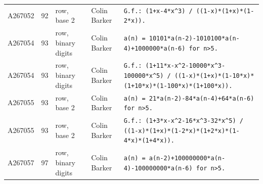 \documentclass[11pt]{article}
\theoremstyle{definition}
\theoremstyle{remark}
\begin{document}
{\begin{longtable}{p{1.3cm}p{0.7cm}p{2.4cm}p{2.3cm}p{7.3cm}}
A267052 & 92 & row, base 2 & Colin Barker & \texttt{G.f.: \allowbreak{}(1+\allowbreak{}x-\allowbreak{}4*\allowbreak{}x\^{}3)\allowbreak{} \allowbreak{}/\allowbreak{} \allowbreak{}((1-\allowbreak{}x)\allowbreak{}*\allowbreak{}(1+\allowbreak{}x)\allowbreak{}*\allowbreak{}(1-\allowbreak{}2*\allowbreak{}x)\allowbreak{})\allowbreak{}.} \\
A267054 & 93 & row, binary digits & Colin Barker & \texttt{a(n)\allowbreak{} \allowbreak{}=\allowbreak{} \allowbreak{}10101*\allowbreak{}a(n-\allowbreak{}2)\allowbreak{}-\allowbreak{}1010100*\allowbreak{}a(n-\allowbreak{}4)\allowbreak{}+\allowbreak{}1000000*\allowbreak{}a(n-\allowbreak{}6)\allowbreak{} \allowbreak{}for \allowbreak{}n>5.} \\
A267054 & 93 & row, binary digits & Colin Barker & \texttt{G.f.: \allowbreak{}(1+\allowbreak{}11*\allowbreak{}x-\allowbreak{}x\^{}2-\allowbreak{}10000*\allowbreak{}x\^{}3-\allowbreak{}100000*\allowbreak{}x\^{}5)\allowbreak{} \allowbreak{}/\allowbreak{} \allowbreak{}((1-\allowbreak{}x)\allowbreak{}*\allowbreak{}(1+\allowbreak{}x)\allowbreak{}*\allowbreak{}(1-\allowbreak{}10*\allowbreak{}x)\allowbreak{}*\allowbreak{}(1+\allowbreak{}10*\allowbreak{}x)\allowbreak{}*\allowbreak{}(1-\allowbreak{}100*\allowbreak{}x)\allowbreak{}*\allowbreak{}(1+\allowbreak{}100*\allowbreak{}x)\allowbreak{})\allowbreak{}.} \\
A267055 & 93 & row, base 2 & Colin Barker & \texttt{a(n)\allowbreak{} \allowbreak{}=\allowbreak{} \allowbreak{}21*\allowbreak{}a(n-\allowbreak{}2)\allowbreak{}-\allowbreak{}84*\allowbreak{}a(n-\allowbreak{}4)\allowbreak{}+\allowbreak{}64*\allowbreak{}a(n-\allowbreak{}6)\allowbreak{} \allowbreak{}for \allowbreak{}n>5.} \\
A267055 & 93 & row, base 2 & Colin Barker & \texttt{G.f.: \allowbreak{}(1+\allowbreak{}3*\allowbreak{}x-\allowbreak{}x\^{}2-\allowbreak{}16*\allowbreak{}x\^{}3-\allowbreak{}32*\allowbreak{}x\^{}5)\allowbreak{} \allowbreak{}/\allowbreak{} \allowbreak{}((1-\allowbreak{}x)\allowbreak{}*\allowbreak{}(1+\allowbreak{}x)\allowbreak{}*\allowbreak{}(1-\allowbreak{}2*\allowbreak{}x)\allowbreak{}*\allowbreak{}(1+\allowbreak{}2*\allowbreak{}x)\allowbreak{}*\allowbreak{}(1-\allowbreak{}4*\allowbreak{}x)\allowbreak{}*\allowbreak{}(1+\allowbreak{}4*\allowbreak{}x)\allowbreak{})\allowbreak{}.} \\
A267057 & 97 & row, binary digits & Colin Barker & \texttt{a(n)\allowbreak{} \allowbreak{}=\allowbreak{} \allowbreak{}a(n-\allowbreak{}2)\allowbreak{}+\allowbreak{}100000000*\allowbreak{}a(n-\allowbreak{}4)\allowbreak{}-\allowbreak{}100000000*\allowbreak{}a(n-\allowbreak{}6)\allowbreak{} \allowbreak{}for \allowbreak{}n>5.} \\

\end{longtable}}
\end{document}
